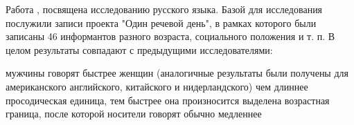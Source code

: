 \par \citep{quene08}
\par \citep{hilton11}
\par Работа \citep{stepanova11}, посвящена исследованию русского языка. Базой для исследования послужили записи проекта "Один речевой день", в рамках которого были записаны 46 информантов разного возраста, социального положения и т. п. В целом результаты совпадают с предыдущими исследователями:
\begin{itemize}
\mytem мужчины говорят быстрее женщин (аналогичные результаты были получены для американского английского, китайского и нидерландского)
\mytem чем длиннее просодическая единица, тем быстрее она произносится
\mytem выделена возрастная граница, после которой носители говорят обычно медленнее
\end{itemize}
\par \citep{kendall13}
\pagebreak
